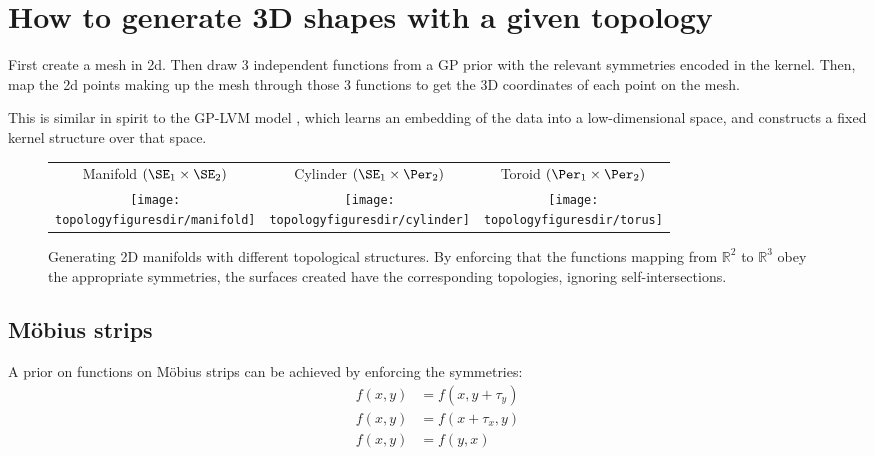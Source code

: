 \section{How to generate 3D shapes with a given topology}

First create a mesh in 2d.  Then draw 3 independent functions from a GP prior with the relevant symmetries encoded in the kernel.  Then, map the 2d points making up the mesh through those 3 functions to get the 3D  coordinates of each point on the mesh.

This is similar in spirit to the GP-LVM model \cite{lawrence2005probabilistic}, which learns an embedding of the data into a low-dimensional space, and constructs a fixed kernel structure over that space.

\begin{figure}
\begin{tabular}{ccc}
Manifold $( \SE_1 \times \SE_2 )$  & Cylinder $( \SE_1 \times \Per_2 )$ & Toroid $( \Per_1 \times \Per_2 )$\\
\texttt{[image: \\topologyfiguresdir/manifold]} &
\texttt{[image: \\topologyfiguresdir/cylinder]} &
\texttt{[image: \\topologyfiguresdir/torus]} \\
\end{tabular}
\caption[Generating 2D manifolds with different topological structures]{Generating 2D manifolds with different topological structures.  By enforcing that the functions mapping from $\mathbb{R}^2$ to $\mathbb{R}^3$ obey the appropriate symmetries, the surfaces created have the corresponding topologies, ignoring self-intersections.}
\label{fig:gen_surf}
\end{figure}



\subsection{M\"{o}bius strips}

A prior on functions on M\"{o}bius strips can be achieved by enforcing the symmetries:
%
\begin{align}
f(x, y) & = f( x, y + \tau_y) \\
f(x, y) & = f( x + \tau_x, y)  \\
f(x, y) & = f( y, x )
\end{align}

